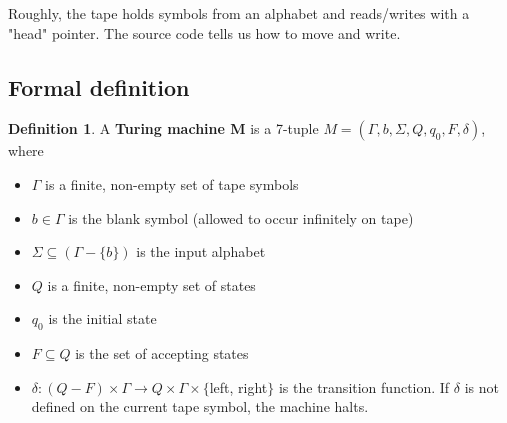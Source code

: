 \documentclass[11pt]{article}
\theoremstyle{plain}
\theoremstyle{definition}
\newtheorem*{defn}{Definition}
\begin{document}
Roughly, the tape holds symbols from an alphabet and reads/writes with a "head" pointer. The source code tells us how to move and write.

\subsection{Formal definition}

\begin{defn}
    A {\bf Turing machine M} is a 7-tuple $M = (\Gamma, b, \Sigma, Q, q_0, F, \delta)$, where
    \begin{itemize}
        \item $\Gamma$ is a finite, non-empty set of tape symbols
        \item $b \in \Gamma$ is the blank symbol (allowed to occur infinitely on tape)
        \item $\Sigma \subseteq (\Gamma - \{b\})$ is the input alphabet 
        \item $Q$ is a finite, non-empty set of states
        \item $q_0$ is the initial state 
        \item $F \subseteq Q$ is the set of accepting states 
        \item $\delta: (Q - F) \times \Gamma \rightarrow Q \times \Gamma \times \{$left, right$\}$ is the transition function. If $\delta$ 
            is not defined on the current tape symbol, the machine halts.
    \end{itemize}
\end{defn}
\end{document}
